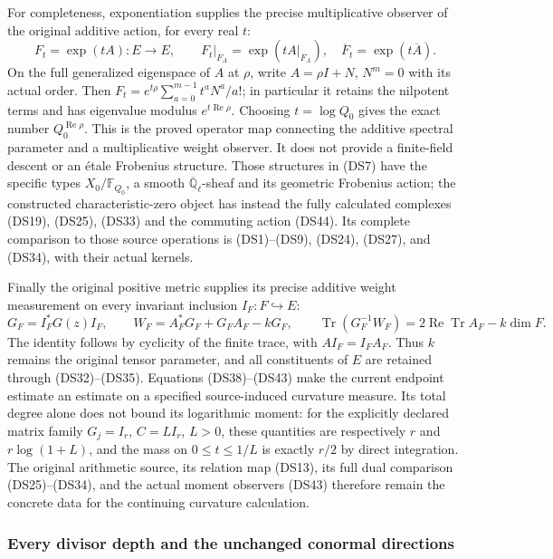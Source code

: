 For completeness, exponentiation supplies the precise multiplicative
observer of the original additive action, for every real $t$:
\[
 F_t=\exp(tA):E\to E,\qquad
 F_t|_{F_A}=\exp(tA|_{F_A}),\quad
 \overline F_t=\exp(t\overline A).
 \tag{DS44}
\]
On the full generalized eigenspace of $A$ at $\rho$, write
$A=\rho I+N$, $N^m=0$ with its actual order.  Then
$F_t=e^{t\rho}\sum_{a=0}^{m-1}t^aN^a/a!$; in particular it
retains the nilpotent terms and has eigenvalue modulus
$e^{t\operatorname{Re}\rho}$.  Choosing $t=\log Q_0$ gives the exact
number $Q_0^{\operatorname{Re}\rho}$.  This is the proved operator
map connecting the additive spectral parameter and a multiplicative
weight observer.  It does not provide a finite-field descent or an
\'{e}tale Frobenius structure.  Those structures in (DS7) have the
specific types $X_0/\mathbb F_{Q_0}$, a smooth
$\overline{\mathbb Q}_\ell$-sheaf and its geometric Frobenius action;
the constructed characteristic-zero object has instead the fully
calculated complexes (DS19), (DS25), (DS33) and the commuting action
(DS44).  Its complete comparison to those source operations is
(DS1)--(DS9), (DS24), (DS27), and (DS34), with their actual kernels.

Finally the original positive metric supplies its precise additive
weight measurement on every invariant inclusion $I_F:F\hookrightarrow E$:
\[
 G_F=I_F^*G(z)I_F,\qquad
 W_F=A_F^*G_F+G_FA_F-kG_F,
 \qquad
 \operatorname{Tr}(G_F^{-1}W_F)=
 2\operatorname{Re}\operatorname{Tr}A_F-k\dim F.
 \tag{DS45}
\]
The identity follows by cyclicity of the finite trace, with
$AI_F=I_FA_F$.  Thus $k$ remains the original tensor parameter,
and all constituents of $E$ are retained through (DS32)--(DS35).
Equations (DS38)--(DS43) make the current endpoint estimate an
estimate on a specified source-induced curvature measure.  Its total
degree alone does not bound its logarithmic moment: for the explicitly
declared matrix family $G_j=I_r$, $C=LI_r$, $L>0$, these quantities
are respectively $r$ and $r\log(1+L)$, and the mass on
$0\leq t\leq1/L$ is exactly $r/2$ by direct integration.
The original arithmetic source, its relation map (DS13), its full
dual comparison (DS25)--(DS34), and the actual moment observers
(DS43) therefore remain the concrete data for the continuing
curvature calculation.

\subsubsection{Every divisor depth and the unchanged conormal directions}

